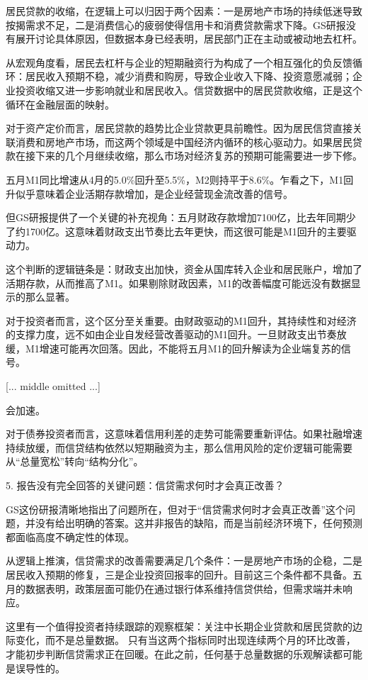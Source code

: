\documentclass[11pt]{ctexart}
\begin{document}
居民贷款的收缩，在逻辑上可以归因于两个因素：一是房地产市场的持续低迷导致按揭需求不足，二是消费信心的疲弱使得信用卡和消费贷款需求下降。GS研报没有展开讨论具体原因，但数据本身已经表明，居民部门正在主动或被动地去杠杆。

从宏观角度看，居民去杠杆与企业的短期融资行为构成了一个相互强化的负反馈循环：居民收入预期不稳，减少消费和购房，导致企业收入下降、投资意愿减弱；企业投资收缩又进一步影响就业和居民收入。信贷数据中的居民贷款收缩，正是这个循环在金融层面的映射。

对于资产定价而言，居民贷款的趋势比企业贷款更具前瞻性。因为居民信贷直接关联消费和房地产市场，而这两个领域是中国经济内循环的核心驱动力。如果居民贷款在接下来的几个月继续收缩，那么市场对经济复苏的预期可能需要进一步下修。

五月M1同比增速从4月的5.0\%回升至5.5\%，M2则持平于8.6\%。乍看之下，M1回升似乎意味着企业活期存款增加，是企业经营现金流改善的信号。

但GS研报提供了一个关键的补充视角：五月财政存款增加7100亿，比去年同期少了约1700亿。这意味着财政支出节奏比去年更快，而这很可能是M1回升的主要驱动力。

这个判断的逻辑链条是：财政支出加快，资金从国库转入企业和居民账户，增加了活期存款，从而推高了M1。如果剔除财政因素，M1的改善幅度可能远没有数据显示的那么显著。

对于投资者而言，这个区分至关重要。由财政驱动的M1回升，其持续性和对经济的支撑力度，远不如由企业自发经营改善驱动的M1回升。一旦财政支出节奏放缓，M1增速可能再次回落。因此，不能将五月M1的回升解读为企业端复苏的信号。

[... middle omitted ...]

会加速。

对于债券投资者而言，这意味着信用利差的走势可能需要重新评估。如果社融增速持续放缓，而信贷结构依然以短期融资为主，那么信用风险的定价逻辑可能需要从“总量宽松”转向“结构分化”。

5. 报告没有完全回答的关键问题：信贷需求何时才会真正改善？

GS这份研报清晰地指出了问题所在，但对于“信贷需求何时才会真正改善”这个问题，并没有给出明确的答案。这并非报告的缺陷，而是当前经济环境下，任何预测都面临高度不确定性的体现。

从逻辑上推演，信贷需求的改善需要满足几个条件：一是房地产市场的企稳，二是居民收入预期的修复，三是企业投资回报率的回升。目前这三个条件都不具备。五月的数据表明，政策层面可能仍在通过银行体系维持信贷供给，但需求端并未响应。

这里有一个值得投资者持续跟踪的观察框架：关注中长期企业贷款和居民贷款的边际变化，而不是总量数据。 只有当这两个指标同时出现连续两个月的环比改善，才能初步判断信贷需求正在回暖。在此之前，任何基于总量数据的乐观解读都可能是误导性的。
\end{document}
